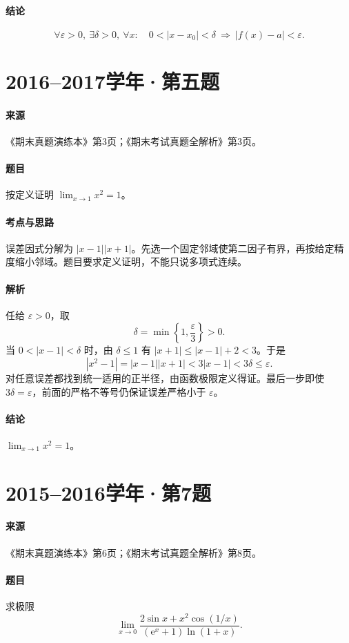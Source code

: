 \documentclass[UTF8,fontset=fandol,12pt,oneside,openany]{ctexrep}
\newcommand{\ee}{\mathrm e}
\theoremstyle{definition}
\begin{document}
\paragraph{结论}
\[
\boxed{\forall\varepsilon>0,\ \exists\delta>0,\ \forall x:
\quad0<|x-x_0|<\delta\ \Longrightarrow\ |f(x)-a|<\varepsilon.}
\]

\par\addvspace{18pt}\noindent\begin{minipage}{\linewidth}
\section{2016--2017学年·第五题}
\paragraph{来源}《期末真题演练本》第3页；《期末考试真题全解析》第3页。
\paragraph{题目}按定义证明 $\lim_{x\to1}x^2=1$。
\end{minipage}\par
\paragraph{考点与思路}误差因式分解为 $|x-1||x+1|$。先选一个固定邻域使第二因子有界，再按给定精度缩小邻域。题目要求定义证明，不能只说多项式连续。
\paragraph{解析}任给 $\varepsilon>0$，取
\[
\delta=\min\left\{1,\frac\varepsilon3\right\}>0.
\]
当 $0<|x-1|<\delta$ 时，由 $\delta\le1$ 有
$|x+1|\le|x-1|+2<3$。于是
\[
|x^2-1|=|x-1||x+1|<3|x-1|<3\delta\le\varepsilon.
\]
对任意误差都找到统一适用的正半径，由函数极限定义得证。最后一步即使 $3\delta=\varepsilon$，前面的严格不等号仍保证误差严格小于 $\varepsilon$。
\paragraph{结论}$\boxed{\lim_{x\to1}x^2=1}$。

\par\addvspace{18pt}\noindent\begin{minipage}{\linewidth}
\section{2015--2016学年·第7题}
\paragraph{来源}《期末真题演练本》第6页；《期末考试真题全解析》第8页。
\paragraph{题目}求极限
\[
\lim_{x\to0}\frac{2\sin x+x^2\cos(1/x)}{(\ee^x+1)\ln(1+x)}.
\]
\end{minipage}\par
\end{document}
